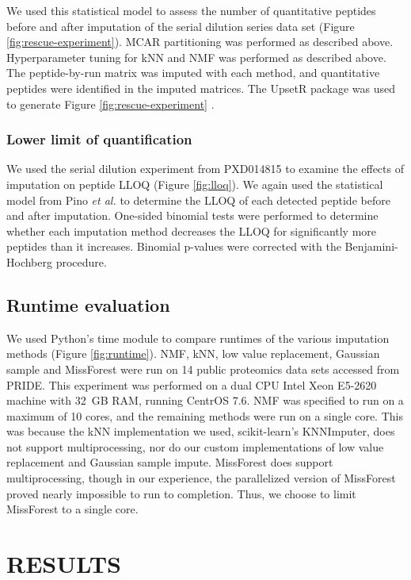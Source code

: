 \documentclass{article}
\begin{document}
We used this statistical model to assess the number of quantitative peptides before and after imputation of the serial dilution series data set (Figure \ref{fig:rescue-experiment}). MCAR partitioning was performed as described above. Hyperparameter tuning for kNN and NMF was performed as described above. The peptide-by-run matrix was imputed with each method, and quantitative peptides were identified in the imputed matrices. The UpsetR package was used to generate Figure \ref{fig:rescue-experiment} \cite{UpsetR}.

\subsubsection{Lower limit of quantification}

We used the serial dilution experiment from PXD014815 to examine the effects of imputation on peptide LLOQ (Figure \ref{fig:lloq}). We again used the statistical model from Pino \textit{et al.} \cite{matrix-matched-calib} to determine the LLOQ of each detected peptide before and after imputation. One-sided binomial tests were performed to determine whether each imputation method decreases the LLOQ for significantly more peptides than it increases. Binomial p-values were corrected with the Benjamini-Hochberg procedure.

\subsection{Runtime evaluation}

We used Python's time module to compare runtimes of the various imputation methods (Figure \ref{fig:runtime}). NMF, kNN, low value replacement, Gaussian sample and MissForest were run on 14 public proteomics data sets accessed from PRIDE. This experiment was performed on a dual CPU Intel Xeon E5-2620 machine with 32~GB RAM, running CentrOS 7.6. NMF was specified to run on a maximum of 10 cores, and the remaining methods were run on a single core. This was because the kNN implementation we used, scikit-learn's KNNImputer, does not support multiprocessing, nor do our custom implementations of low value replacement and Gaussian sample impute. MissForest does support multiprocessing, though in our experience, the parallelized version of MissForest proved nearly impossible to run to completion. Thus, we choose to limit MissForest to a single core.

\section{RESULTS}
\end{document}
